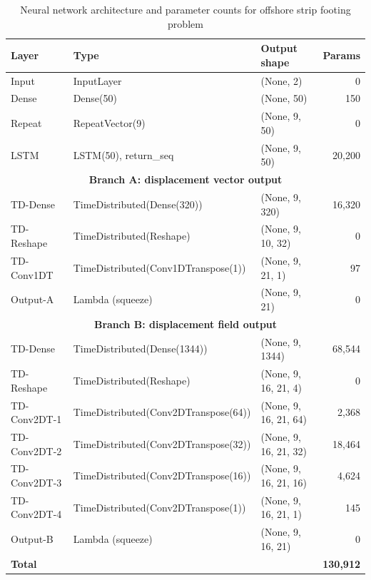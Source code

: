 \begin{table}[t]
\centering
\caption{Neural network architecture and parameter counts for offshore strip footing problem}
\label{tab:nn_architecture1}
\small
\setlength{\tabcolsep}{5pt}
\begin{tabular}{lll r}
\toprule
Layer & Type & Output shape & Params \\
\midrule
Input & InputLayer & (None, 2) & 0 \\
Dense & Dense(50) & (None, 50) & 150 \\
Repeat & RepeatVector(9) & (None, 9, 50) & 0 \\
LSTM & LSTM(50), return\_seq & (None, 9, 50) & 20{,}200 \\
\midrule
\multicolumn{4}{c}{\textbf{Branch A: displacement vector output}} \\
\midrule
TD-Dense & TimeDistributed(Dense(320)) & (None, 9, 320) & 16{,}320 \\
TD-Reshape & TimeDistributed(Reshape) & (None, 9, 10, 32) & 0 \\
TD-Conv1DT & TimeDistributed(Conv1DTranspose(1)) & (None, 9, 21, 1) & 97 \\
Output-A & Lambda (squeeze) & (None, 9, 21) & 0 \\
\midrule
\multicolumn{4}{c}{\textbf{Branch B: displacement field output}} \\
\midrule
TD-Dense & TimeDistributed(Dense(1344)) & (None, 9, 1344) & 68{,}544 \\
TD-Reshape & TimeDistributed(Reshape) & (None, 9, 16, 21, 4) & 0 \\
TD-Conv2DT-1 & TimeDistributed(Conv2DTranspose(64)) & (None, 9, 16, 21, 64) & 2{,}368 \\
TD-Conv2DT-2 & TimeDistributed(Conv2DTranspose(32)) & (None, 9, 16, 21, 32) & 18{,}464 \\
TD-Conv2DT-3 & TimeDistributed(Conv2DTranspose(16)) & (None, 9, 16, 21, 16) & 4{,}624 \\
TD-Conv2DT-4 & TimeDistributed(Conv2DTranspose(1)) & (None, 9, 16, 21, 1) & 145 \\
Output-B & Lambda (squeeze) & (None, 9, 16, 21) & 0 \\
\midrule
\textbf{Total} &  &  & \textbf{130{,}912} \\
\bottomrule
\end{tabular}
\end{table}

